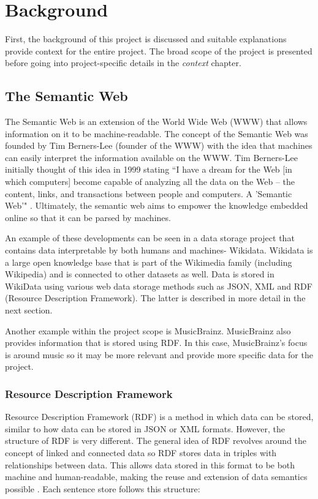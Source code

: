 \usetikzlibrary {arrows}
\usetikzlibrary {shapes.geometric}
\usetikzlibrary {patterns}

\chapter{Background}
First, the background of this project is discussed and suitable explanations provide context for the entire project. The broad scope of the project is presented before going into project-specific details in the \textit{context} chapter.

\section{The Semantic Web}
\hspace*{0.5cm} The Semantic Web is an extension of the World Wide Web (WWW) that allows information on it to be machine-readable. \cite{semanticweb} The concept of the Semantic Web was founded by Tim Berners-Lee (founder of the WWW) with the idea that machines can easily interpret the information available on the WWW. Tim Berners-Lee initially thought of this idea in 1999 stating ``I have a dream for the Web [in which computers] become capable of analyzing all the data on the Web – the content, links, and transactions between people and computers. A 'Semantic Web'" \cite{berners-TBLBook}. Ultimately, the semantic web aims to empower the knowledge embedded online so that it can be parsed by machines. \cite{semanticweb} 

An example of these developments can be seen in a data storage project that contains data interpretable by both humans and machines- Wikidata. Wikidata is a large open knowledge base that is part of the Wikimedia family (including Wikipedia) and is connected to other datasets as well. \cite{wikidata} Data is stored in WikiData using various web data storage methods such as JSON, XML and RDF (Resource Description Framework). The latter is described in more detail in the next section.  

Another example within the project scope is MusicBrainz. MusicBrainz also provides information that is stored using RDF. \cite{musicbrainz} In this case, MusicBrainz's focus is around music so it may be more relevant and provide more specific data for the project. 

\subsection{Resource Description Framework}
\hspace*{0.5cm} Resource Description Framework (RDF) is a method in which data can be stored, similar to how data can be stored in JSON or XML formats. However, the structure of RDF is very different. The general idea of RDF revolves around the concept of linked and connected data so RDF stores data in triples with relationships between data. This allows data stored in this format to be both machine and human-readable, making the reuse and extension of data semantics possible \cite{rdf}. Each sentence store follows this structure: 

